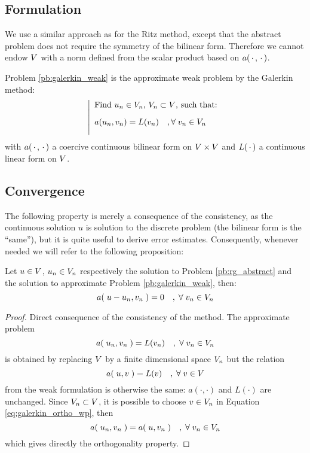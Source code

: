 \subsection{Formulation}

We use a similar approach as for the Ritz method, except that the abstract problem does not require the symmetry of the bilinear form.
Therefore we cannot endow ${V}$ with a norm defined from the scalar product based on $a(\,{\mathbf\cdot}\,,\,{\mathbf\cdot}\,)$.

\medskip
Problem \eqref{pb:galerkin_weak} is the approximate weak problem by the Galerkin method:
\begin{equation}\label{pb:galerkin_weak}
\left\lvert
\begin{array}{ll}
\mbox{Find $u_n \in {V}_n$, ${V}_n \subset {V}$, such that:}\\[2ex]
a( u_n, v_n ) = L(v_n)\quad,{\forall\;}  v_n \in {V}_n\\[2ex]
\end{array}
\right .
\end{equation}
with $a(\,{\mathbf\cdot}\,,\,{\mathbf\cdot}\,)$ a coercive continuous bilinear form on ${V}\times{V}$ and $L(\,{\mathbf\cdot}\,)$ a continuous linear form on ${V}$.


\subsection{Convergence}

The following property is merely a consequence of the consistency, as the continuous solution $u$ is solution to the discrete problem (\ie the bilinear form is the ``same''), but it is quite useful to derive error estimates.
Consequently, whenever needed we will refer to the following proposition:
\begin{prpstn}
 Let $u \in {V}$, $u_n \in {V}_n$ respectively the solution to Problem \eqref{pb:rg_abstract} and the solution to approximate Problem \eqref{pb:galerkin_weak}, then:
\begin{equation*}
a(\;u - u_n, v_n\;) = 0\quad,\;{\forall\;} v_n \in {V}_n
\end{equation*}
\end{prpstn}
\begin{proof}
Direct consequence of the consistency of the method. The approximate problem
\begin{equation}\label{eq:galerkin_ortho_ap}
a(\;u_n, v_n\;) = L(v_n)\quad,\;{\forall\;} v_n \in {V}_n
\end{equation}
is obtained by replacing ${V}$ by a finite dimensional space ${V}_n$ but the relation
\begin{equation}\label{eq:galerkin_ortho_wp}
a(\;u, v\;) = L(v)\quad,\;{\forall\;} v \in {V}
\end{equation}
from the weak formulation is otherwise the same: $a(\cdot,\cdot)$ and $L(\cdot)$ are unchanged.
Since ${V}_n \subset {V}$, it is possible to choose $v \in {V}_n$ in Equation \eqref{eq:galerkin_ortho_wp}, then
\begin{equation}
a(\;u_n, v_n\;) = a(\;u, v_n\;)\quad,\;{\forall\;} v_n \in {V}_n
\end{equation}
which gives directly the orthogonality property.
\end{proof}

